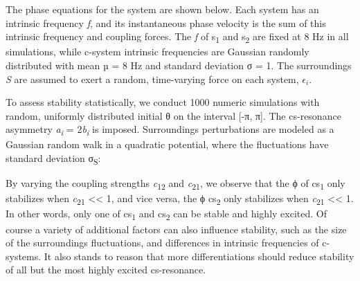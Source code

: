 

  The phase equations for the system are shown below. Each system has an intrinsic frequency \textit{f}, and its instantaneous phase velocity is the sum of this intrinsic frequency and coupling forces. The \textit{f} of s\textsubscript{1} and s\textsubscript{2} are fixed at 8 Hz in all simulations, while c-system intrinsic frequencies are Gaussian randomly distributed with mean µ = 8 Hz and standard deviation σ = 1. The surroundings \textit{S} are assumed to exert a random, time-varying force on each system,  ${\epsilon} _{i}$. 


  To assess stability statistically, we conduct 1000 numeric simulations with random, uniformly distributed initial θ on the interval [-π, π]. The cs-resonance asymmetry \textit{a\textsubscript{i}} = 2\textit{b\textsubscript{i}} is imposed. Surroundings perturbations are modeled as a Gaussian random walk in a quadratic potential, where the fluctuations have standard deviation σ\textsubscript{S}:

 

  By varying the coupling strengths \textit{c}\textsubscript{12} and \textit{c}\textsubscript{21},  we observe that the ϕ of cs\textsubscript{1} only stabilizes when \textit{c}\textsubscript{21} << 1, and vice versa, the ϕ  cs\textsubscript{2} only stabilizes when \textit{c}\textsubscript{21} << 1. In other words, only one of cs\textsubscript{1} and cs\textsubscript{2} can be stable and highly excited. Of course a variety of additional factors can also influence stability, such as the size of the surroundings fluctuations, and differences in intrinsic frequencies of c-systems. It also stands to reason that more differentiations should reduce stability of all but the most highly excited cs-resonance.

